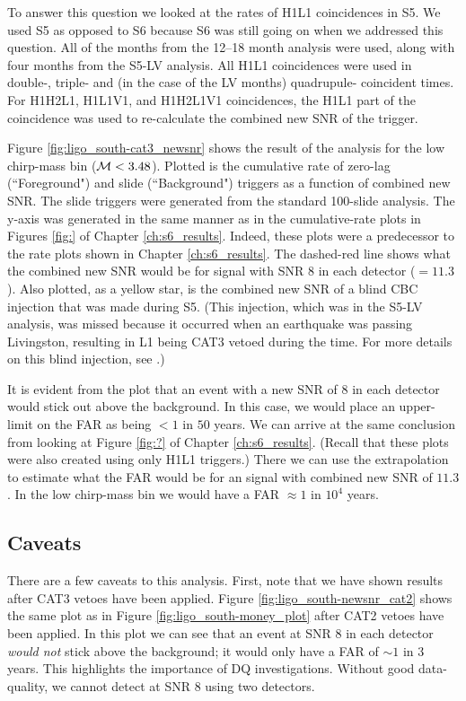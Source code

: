 To answer this question we looked at the rates of H1L1 coincidences in \ac{S5}. We used \ac{S5} as opposed to \ac{S6} because \ac{S6} was still going on when we addressed this question. All of the months from the 12--18 month analysis were used, along with four months from the \ac{S5}-LV analysis. All H1L1 coincidences were used in double-, triple- and (in the case of the LV months) quadrupule- coincident times. For H1H2L1, H1L1V1, and H1H2L1V1 coincidences, the H1L1 part of the coincidence was used to re-calculate the combined new \ac{SNR} of the trigger.

Figure \ref{fig:ligo_south-cat3_newsnr} shows the result of the analysis for the low chirp-mass bin ($\mathcal{M} < 3.48$). Plotted is the cumulative rate of zero-lag (``Foreground") and slide (``Background") triggers as a function of combined new \ac{SNR}. The slide triggers were generated from the standard 100-slide \ihope analysis. The y-axis was generated in the same manner as in the cumulative-rate plots in Figures \ref{fig:} of Chapter \ref{ch:s6_results}. Indeed, these plots were a predecessor to the rate plots shown in Chapter \ref{ch:s6_results}. The dashed-red line shows what the combined new \ac{SNR} would be for signal with \ac{SNR} $8$ in each detector ($= 11.3$). Also plotted, as a yellow star, is the combined new \ac{SNR} of a blind \ac{CBC} injection that was made during \ac{S5}. (This injection, which was in the \ac{S5}-LV analysis, was missed because it occurred when an earthquake was passing Livingston, resulting in L1 being CAT3 vetoed during the time. For more details on this blind injection, see \cite{S5LowMassLV}.)

It is evident from the plot that an event with a new \ac{SNR} of $8$ in each detector would stick out above the background. In this case, we would place an upper-limit on the \ac{FAR} as being $< 1$ in $50$ years. We can arrive at the same conclusion from looking at Figure \ref{fig:?} of Chapter \ref{ch:s6_results}. (Recall that these plots were also created using only H1L1 triggers.) There we can use the extrapolation to estimate what the \ac{FAR} would be for an signal with combined new \ac{SNR} of $11.3$. In the low chirp-mass bin we would have a \ac{FAR} $\approx 1$ in $10^4$ years. 

\subsection{Caveats}

There are a few caveats to this analysis. First, note that we have shown results after CAT3 vetoes have been applied. Figure \ref{fig:ligo_south-newsnr_cat2} shows the same plot as in Figure \ref{fig:ligo_south-money_plot} after CAT2 vetoes have been applied. In this plot we can see that an event at \ac{SNR} $8$ in each detector \emph{would not} stick above the background; it would only have a \ac{FAR} of $\sim1$ in $3$ years. This highlights the importance of \ac{DQ} investigations. Without good data-quality, we cannot detect at \ac{SNR} $8$ using two detectors.

